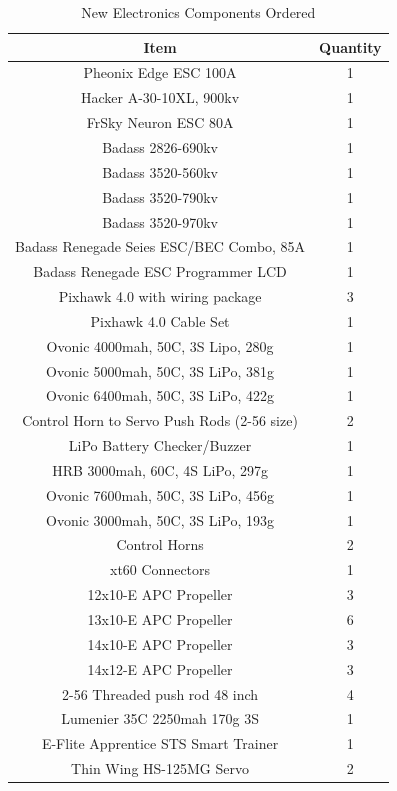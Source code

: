 \documentclass{article}
\begin{document}
\begin{table}[h!]
\centering
\begin{tabular}{|c|c|} 
 \hline
 \textbf{Item} & \textbf{Quantity} \\
 \hline
 Pheonix Edge ESC 100A & 1 \\
 \hline
 Hacker A-30-10XL, 900kv & 1 \\
 \hline
 FrSky Neuron ESC 80A & 1 \\
 \hline
Badass 2826-690kv & 1 \\
 \hline
 Badass 3520-560kv & 1 \\ 
 \hline
 Badass 3520-790kv & 1 \\
 \hline
 Badass 3520-970kv & 1 \\
 \hline
 Badass Renegade Seies ESC/BEC Combo, 85A & 1 \\
 \hline
Badass Renegade ESC Programmer LCD & 1 \\
 \hline
Pixhawk 4.0 with wiring package & 3 \\
 \hline
Pixhawk 4.0 Cable Set & 1 \\
 \hline
 Ovonic 4000mah, 50C, 3S Lipo, 280g & 1 \\
 \hline
Ovonic 5000mah, 50C, 3S LiPo, 381g & 1 \\
 \hline
Ovonic 6400mah, 50C, 3S LiPo, 422g & 1 \\
 \hline
Control Horn to Servo Push Rods (2-56 size) & 2 \\
 \hline 
 LiPo Battery Checker/Buzzer & 1 \\
 \hline 
HRB 3000mah, 60C, 4S LiPo, 297g & 1 \\
 \hline
Ovonic 7600mah, 50C, 3S LiPo, 456g & 1 \\
 \hline
Ovonic 3000mah, 50C, 3S LiPo, 193g & 1 \\
 \hline
Control Horns & 2 \\
 \hline
xt60 Connectors & 1 \\
 \hline
12x10-E APC Propeller & 3 \\
 \hline
13x10-E APC Propeller & 6 \\
 \hline
14x10-E APC Propeller & 3 \\
 \hline
14x12-E APC Propeller & 3 \\
 \hline
2-56 Threaded push rod 48 inch & 4 \\
 \hline
Lumenier 35C 2250mah 170g 3S & 1 \\
 \hline
E-Flite Apprentice STS Smart Trainer  & 1 \\
 \hline
Thin Wing HS-125MG Servo & 2 \\
 \hline
\end{tabular}
\caption{New Electronics Components Ordered}
\label{table:order list}
\end{table}
\end{document}
